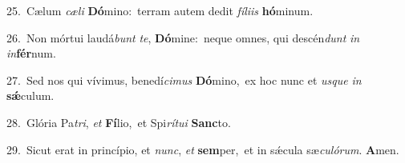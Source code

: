 {\numbfont\textcolor{\numbcolor}{25.}}~Cælum \textit{cæ}\-\textit{li} \textbf{Dó}\-mino:~\star terram autem dedit \textit{fí}\-\textit{li}\textit{is} \textbf{hó}\-minum.\par
{\numbfont\textcolor{\numbcolor}{26.}}~Non mórtui laudá\textit{bunt} \textit{te}\-, \textbf{Dó}\-mine:~\star neque omnes, qui descén\textit{dunt} \textit{in} \textit{in}\-\textbf{fér}num.\par
{\numbfont\textcolor{\numbcolor}{27.}}~Sed nos qui vívimus, benedí\-\textit{ci}\-\textit{mus} \textbf{Dó}\-mino,~\star ex hoc nunc et \textit{us}\-\textit{que} \textit{in} \textbf{sǽ}\-culum.\par
{\numbfont\textcolor{\numbcolor}{28.}}~Glória Pa\-\textit{tri}\-, \textit{et} \textbf{Fí}\-lio,~\star et Spi\-\textit{rí}\-\textit{tu}\textit{i} \textbf{Sanc}\-to.\par
{\numbfont\textcolor{\numbcolor}{29.}}~Sicut erat in princípio, et \textit{nunc}\-, \textit{et} \textbf{sem}\-per,~\star et in sǽcula sæ\-\textit{cu}\-\textit{ló}\textit{rum}. \textbf{A}\-men.\par
